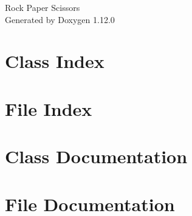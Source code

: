 \documentclass[twoside]{book}
\newcommand{\+}{\discretionary{\mbox{\scriptsize$\hookleftarrow$}}{}{}}
\newcommand{\clearemptydoublepage}{%
    \newpage{\pagestyle{empty}\cleardoublepage}%
  }
\begin{document}
  \raggedbottom
    \hypersetup{pageanchor=false,
                bookmarksnumbered=true,
                pdfencoding=unicode
               }
  \begin{titlepage}
  \vspace*{7cm}
  \begin{center}%
  {\Large Rock Paper Scissors}\\
  \vspace*{1cm}
  {\large Generated by Doxygen 1.12.0}\\
  \end{center}
  \end{titlepage}
  \clearemptydoublepage
  \tableofcontents
  \clearemptydoublepage
  \hypersetup{pageanchor=true}
\chapter{Class Index}

\chapter{File Index}

\chapter{Class Documentation}

\chapter{File Documentation}







  \backmatter
  \newpage
  \clearemptydoublepage
  \printindex
\end{document}
